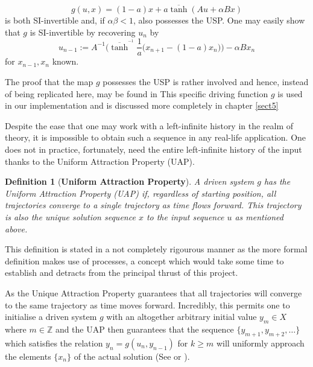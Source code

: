 \documentclass[a4paper,12pt,twoside]{report}
\newtheorem{Definition}{Definition}[]
\begin{document}
\begin{equation}  \label{eqn_driving}
  g(u,x) = (1-a)x + a\overline{\tanh}(Au + \alpha Bx)
\end{equation} 
is both SI-invertible and, if $\alpha\beta<1$, also possesses the USP. 
One may easily show that $g$ is SI-invertible by recovering $u_n$ by 
\begin{equation} \label{eqn_SI_RNN}
  u_{n-1} := A^{-1}\bigg(\overline{\tanh}^{^{-1}}\frac{1}{a}\Big(x_{n+1}-(1-a)x_n\Big) \bigg) - \alpha B x_n
  \end{equation}
  for $x_{n-1}, x_n$ known.

The proof that the map $g$ possesses the USP is rather involved and hence, instead of being replicated here, may be found in \cite[Th.2]{manjunath2013echo }
This specific driving function $g$ is used in our implementation and is discussed more completely in chapter \ref{sect5}

Despite the ease that one may work with a left-infinite history in the realm of theory, it is impossible to obtain such a sequence in any real-life application.  
One does not in practice, fortunately, need the entire left-infinite history of the input thanks to the Uniform Attraction Property (UAP).

\begin{Definition}
  [\bf Uniform Attraction Property]\label{Dfn_UAP}\rm
  A driven system $g$ has the Uniform Attraction Property (UAP) if, regardless of starting position, all trajectories converge to a single trajectory as time flows forward. 
  This trajectory is also the unique solution sequence $x$ to the input sequence $u$ as mentioned above.
\end{Definition}

This definition is stated in a not completely rigourous manner as the more formal definition makes use of processes, a concept which would take some time to establish and detracts from the principal thrust of this project. 

As the Unique Attraction Property guarantees that all trajectories will converge to the same trajectory as time moves forward. 
Incredibly, this permits one to initialise a driven system $g$ with an altogether arbitrary initial value $y_m\in{X}$ where $m\in\mathbb{Z}$ and the UAP then guarantees that the sequence $\{y_{m+1}, y_{m+2},\ldots\}$ which satisfies the relation $y_n=g(u_n, y_{n-1})$  for  $k\geq{m}$  will uniformly approach the elements $\{x_n\}$ of the actual solution (See \cite[Th.11,]{Manju_Nonlinearity} or \cite[Eqn.18]{Supp}).
 
\end{document}
